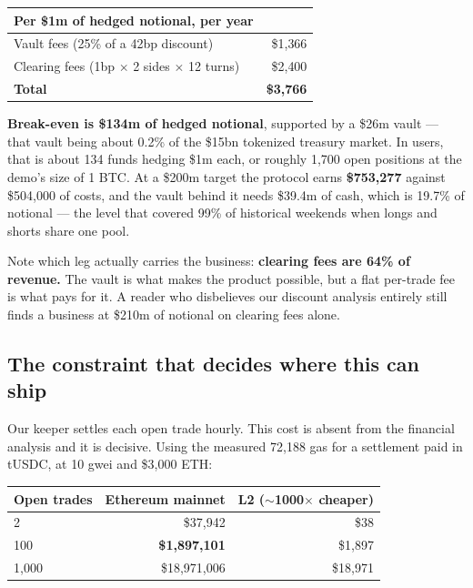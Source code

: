 \documentclass[11pt,a4paper]{article}
\newcommand{\cbox}[1]{%
  \begin{center}\colorbox{panel}{\parbox{0.95\textwidth}{\vspace{3pt}#1\vspace{3pt}}}\end{center}}
\begin{document}
\begin{center}
\small
\begin{tabular}{@{}lr@{}}
\toprule
\textbf{Per \$1m of hedged notional, per year} & \\
\midrule
Vault fees (25\% of a 42bp discount) & \$1{,}366 \\
Clearing fees (1bp $\times$ 2 sides $\times$ 12 turns) & \$2{,}400 \\
\midrule
\textbf{Total} & \textbf{\$3{,}766} \\
\bottomrule
\end{tabular}
\end{center}

\cbox{\textbf{Break-even is \$134m of hedged notional}, supported by a \$26m vault --- that vault
being about 0.2\% of the \$15bn tokenized treasury market. In users, that is about 134 funds hedging
\$1m each, or roughly 1,700 open positions at the demo's size of 1 BTC. At a \$200m target the
protocol earns \textbf{\$753,277} against \$504,000 of costs, and the vault behind it needs \$39.4m of
cash, which is 19.7\% of notional — the level that covered 99\% of historical weekends when longs and
shorts share one pool.}

Note which leg actually carries the business: \textbf{clearing fees are 64\% of revenue.} The vault
is what makes the product possible, but a flat per-trade fee is what pays for it. A reader who
disbelieves our discount analysis entirely still finds a business at \$210m of notional on clearing
fees alone.

\subsection{The constraint that decides where this can ship}\label{sec:gasconstraint}

Our keeper settles each open trade hourly. This cost is absent from the financial analysis and it is
decisive. Using the measured 72,188 gas for a settlement paid in tUSDC, at 10 gwei and \$3,000 ETH:

\begin{center}
\small
\begin{tabular}{@{}lrr@{}}
\toprule
\textbf{Open trades} & \textbf{Ethereum mainnet} & \textbf{L2 ($\sim$1000$\times$ cheaper)} \\
\midrule
2 & \$37{,}942 & \$38 \\
100 & \textbf{\$1{,}897{,}101} & \$1{,}897 \\
1{,}000 & \$18{,}971{,}006 & \$18{,}971 \\
\bottomrule
\end{tabular}
\end{center}
\end{document}
